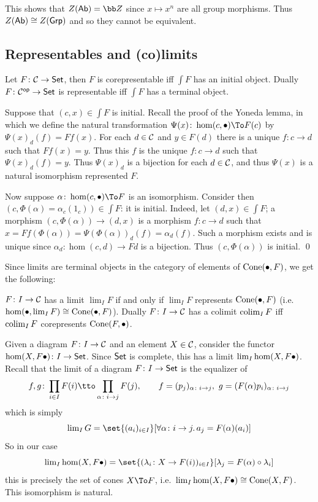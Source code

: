     This shows that $Z(\ab)=\bZ$ since $x\mapsto x^n$ are all group morphisms.
    Thus $Z({\sf Ab})\cong Z({\sf Grp})$ and so they cannot be equivalent.

\eexam

\subsection{Representables and (co)limits}

\bprop

    Let $F\colon{{\cal C}}\to{\sf Set}$, then $F$ is corepresentable iff $\int F$ has an initial object.
    Dually $F\colon{{\cal C}}^{\sf op}\to{\sf Set}$ is representable iff $\int F$ has a terminal object.

\eprop

\bproof

    Suppose that $(c,x)\in\int F$ is initial.
    Recall the proof of the Yoneda lemma, in which we define the natural transformation $\Psi(x)\colon\hom(c,\bul)\To F(c)$ by $\Psi(x)_d(f)=Ff(x)$.
    For each $d\in{{\cal C}}$ and $y\in F(d)$ there is a unique $f\colon c\to d$ such that $Ff(x)=y$.
    Thus this $f$ is the unique $f\colon c\to d$ such that $\Psi(x)_d(f)=y$.
    Thus $\Psi(x)_d$ is a bijection for each $d\in{{\cal C}}$, and thus $\Psi(x)$ is a natural isomorphism represented $F$.

    Now suppose $\alpha\colon\hom(c,\bul)\To F$ is an isomorphism.
    Consider then $(c,\Phi(\alpha)=\alpha_c(1_c))\in\int F$: it is initial.
    Indeed, let $(d,x)\in\int F$; a morphism $(c,\Phi(\alpha))\to(d,x)$ is a morphism $f\colon c\to d$ such that $x=Ff(\Phi(\alpha))=\Psi(\Phi(\alpha))_d(f)=\alpha_d(f)$.
    Such a morphism exists and is unique since $\alpha_d\colon\hom(c,d)\to Fd$ is a bijection.
    Thus $(c,\Phi(\alpha))$ is initial.
    \qed

\eproof

Since limits are terminal objects in the category of elements of ${\rm Cone}(\bullet,F)$, we get the following:

\bcoro

    $F\colon I\to{{\cal C}}$ has a limit $\lim_IF$ if and only if $\lim_IF$ represents ${\rm Cone}(\bullet,F)$ (i.e.\ $\hom(\bullet,\mathop{\rm lim}\nolimits_IF)\cong{\rm Cone}(\bullet,F)$).
    Dually $F\colon I\to{{\cal C}}$ has a colimit $\mathop{\rm colim}\nolimits_IF$ iff $\mathop{\rm colim}\nolimits_IF$ corepresents ${\rm Cone}(F,\bullet)$.

\ecoro

Given a diagram $F\colon I\to{{\cal C}}$ and an element $X\in{{\cal C}}$, consider the functor $\hom(X,F\bullet)\colon I\to{\sf Set}$.
Since ${\sf Set}$ is complete, this has a limit $\mathop{\rm lim}\nolimits_I\hom(X,F\bullet)$.
Recall that the limit of a diagram $F\colon I\to{\sf Set}$ is the equalizer of
$$ f,g\colon\prod_{i\in I}F(i)\tto\prod_{\alpha\colon i\to j}F(j),\qquad f=(p_j)_{\alpha\colon i\to j},\ g=(F(\alpha)p_i)_{\alpha\colon i\to j} $$
which is simply
$$ \lim_IG = \set{(a_i)_{i\in I}}[\forall\alpha\colon i\to j.\,a_j=F(\alpha)(a_i)] $$
So in our case
$$ \lim_I\hom(X,F\bul) = \set{(\lambda_i\colon X\to F(i))_{i\in I}}[\lambda_j=F(\alpha)\circ\lambda_i] $$
this is precisely the set of cones $X\To F$, i.e.\ $\mathop{\rm lim}\nolimits_I\hom(X,F\bullet)\cong{\rm Cone}(X,F)$.
This isomorphism is natural.

